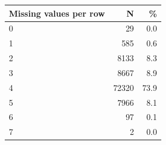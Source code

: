 \begin{threeparttable}


\begin{tabular}{@{}lrr@{}}


\toprule


\textbf{Missing values per row} & \textbf{N} & \textbf{\%} \\


\midrule


\midrule
0           &          29&         0.0\\
1           &         585&         0.6\\
2           &        8133&         8.3\\
3           &        8667&         8.9\\
4           &       72320&        73.9\\
5           &        7966&         8.1\\
6           &          97&         0.1\\
7           &           2&         0.0\\
\bottomrule


\end{tabular}


\end{threeparttable}
